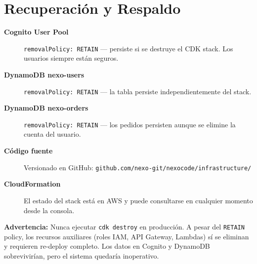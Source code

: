 \documentclass[12pt,a4paper]{article}
\begin{document}
\section{Recuperación y Respaldo}

\begin{description}
  \item[\textbf{Cognito User Pool}] \texttt{removalPolicy: RETAIN} --- persiste si se
    destruye el CDK stack. Los usuarios siempre están seguros.
  \item[\textbf{DynamoDB nexo-users}] \texttt{removalPolicy: RETAIN} --- la tabla persiste
    independientemente del stack.
  \item[\textbf{DynamoDB nexo-orders}] \texttt{removalPolicy: RETAIN} --- los pedidos
    persisten aunque se elimine la cuenta del usuario.
  \item[\textbf{Código fuente}] Versionado en GitHub:
    \texttt{github.com/nexo-git/nexocode/infrastructure/}
  \item[\textbf{CloudFormation}] El estado del stack está en AWS y puede consultarse
    en cualquier momento desde la consola.
\end{description}

\begin{nexobox}
\textbf{Advertencia:} Nunca ejecutar \texttt{cdk destroy} en producción. A pesar del
\texttt{RETAIN} policy, los recursos auxiliares (roles IAM, API Gateway, Lambdas)
sí se eliminan y requieren re-deploy completo. Los datos en Cognito y DynamoDB
sobrevivirían, pero el sistema quedaría inoperativo.
\end{nexobox}

\vfill
\begin{center}
\end{center}
\end{document}
